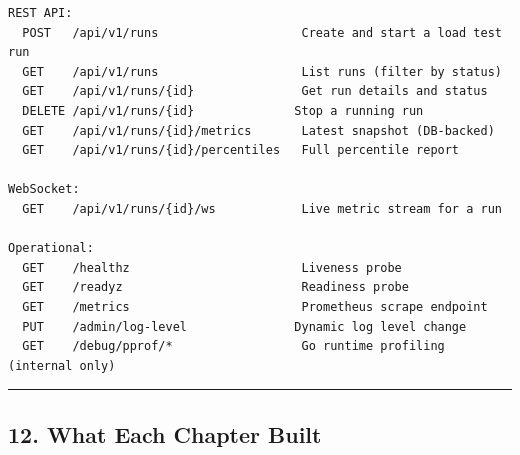 \documentclass[
]{article}
\begin{document}
\begin{verbatim}
REST API:
  POST   /api/v1/runs                    Create and start a load test run
  GET    /api/v1/runs                    List runs (filter by status)
  GET    /api/v1/runs/{id}               Get run details and status
  DELETE /api/v1/runs/{id}              Stop a running run
  GET    /api/v1/runs/{id}/metrics       Latest snapshot (DB-backed)
  GET    /api/v1/runs/{id}/percentiles   Full percentile report

WebSocket:
  GET    /api/v1/runs/{id}/ws            Live metric stream for a run

Operational:
  GET    /healthz                        Liveness probe
  GET    /readyz                         Readiness probe
  GET    /metrics                        Prometheus scrape endpoint
  PUT    /admin/log-level               Dynamic log level change
  GET    /debug/pprof/*                  Go runtime profiling (internal only)
\end{verbatim}

\begin{center}\rule{0.5\linewidth}{0.5pt}\end{center}

\hypertarget{what-each-chapter-built}{%
\subsection{12. What Each Chapter Built}\label{what-each-chapter-built}}
\end{document}
